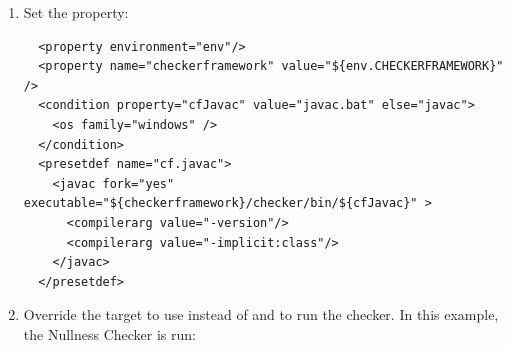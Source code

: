 \begin{enumerate}
\item
Set the  property:

\begin{smaller}
\begin{Verbatim}
  <property environment="env"/>
  <property name="checkerframework" value="${env.CHECKERFRAMEWORK}" />
  <condition property="cfJavac" value="javac.bat" else="javac">
    <os family="windows" />
  </condition>
  <presetdef name="cf.javac">
    <javac fork="yes" executable="${checkerframework}/checker/bin/${cfJavac}" >
      <compilerarg value="-version"/>
      <compilerarg value="-implicit:class"/>
    </javac>
  </presetdef>
\end{Verbatim}
\end{smaller}

\item
Override the  target to
use  instead of  and to run the checker.
In this example, the Nullness Checker is run:


\end{enumerate}
